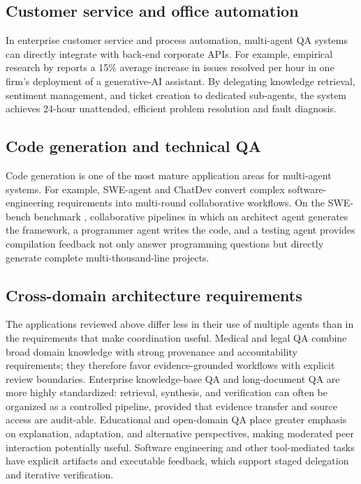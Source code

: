 \documentclass[a4paper,fleqn]{cas-dc}
\begin{document}
\subsection{Customer service and office automation}
\label{sec:enterprise}

In enterprise customer service and process automation, multi-agent QA
systems can directly integrate with back-end corporate APIs.
For example, empirical research by \citet{brynjolfsson2023generative_ai_work}
reports a 15\% average increase in issues resolved per hour in one firm's
deployment of a generative-AI assistant.
By delegating knowledge retrieval, sentiment management, and ticket creation
to dedicated sub-agents, the system achieves 24-hour unattended, efficient
problem resolution and fault diagnosis.

\subsection{Code generation and technical QA}
\label{sec:code}

Code generation is one of the most mature application areas for multi-agent
systems.
For example, SWE-agent \citep{yang2024swe_agent} and ChatDev \citep{qian2023chatdev}
convert complex software-engineering requirements into multi-round
collaborative workflows.
On the SWE-bench benchmark \citep{jimenez2024swe_bench}, collaborative
pipelines in which an architect agent generates the framework, a programmer
agent writes the code, and a testing agent provides compilation feedback
not only answer programming questions but directly generate complete
multi-thousand-line projects.

\subsection{Cross-domain architecture requirements}
\label{sec:application_requirements}

The applications reviewed above differ less in their use of multiple agents
than in the requirements that make coordination useful. Medical and legal QA
combine broad domain knowledge with strong provenance and accountability
requirements; they therefore favor evidence-grounded workflows with explicit
review boundaries. Enterprise knowledge-base QA and long-document QA are more
highly standardized: retrieval, synthesis, and verification can often be
organized as a controlled pipeline, provided that evidence transfer and source
access are audit-able. Educational and open-domain QA place greater emphasis on
explanation, adaptation, and alternative perspectives, making moderated peer
interaction potentially useful. Software engineering and other tool-mediated
tasks have explicit artifacts and executable feedback, which support staged
delegation and iterative verification.
\end{document}
